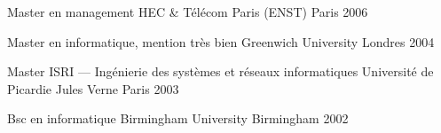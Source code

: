 


\begin{cventries}

  \cventry
    {Master en management} %
    {HEC \& Télécom Paris (ENST)} %
    {Paris} %
    {2006} %
    {}
    {}

  \cventry
    {Master en informatique, mention très bien} %
    {Greenwich University} %
    {Londres} %
    {2004} %
    {}
    {}

  \cventry
    {Master ISRI — Ingénierie des systèmes et réseaux informatiques} %
    {Université de Picardie Jules Verne} %
    {Paris} %
    {2003} %
    {}
    {}

  \cventry
    {Bsc en informatique} %
    {Birmingham University} %
    {Birmingham} %
    {2002} %
    {}
    {}
\end{cventries}
